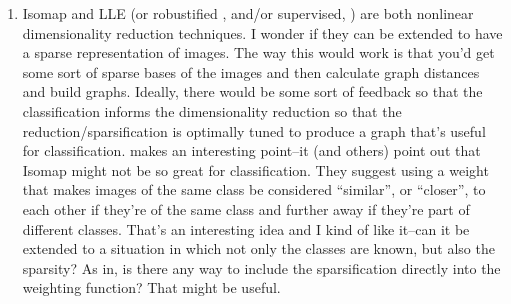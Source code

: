 \documentclass{nih}
\begin{document}
\begin{enumerate}
\item Isomap \cite{tenenbaum_global_2000} and LLE \cite{roweis_nonlinear_2000} (or robustified \cite{saxena_non-linear_2004}, and/or supervised, \cite{raducanu_supervised_2012,yang_extended_2002}) are both nonlinear dimensionality reduction techniques.  I wonder if they can be extended to have a sparse representation of images.  The way this would work is that you'd get some sort of sparse bases of the images and then calculate graph distances and build graphs.  Ideally, there would be some sort of feedback so that the classification informs the dimensionality reduction so that the reduction/sparsification is optimally tuned to produce a graph that's useful for classification.  \cite{geng_supervised_2005} makes an interesting point--it (and others) point out that Isomap might not be so great for classification.  They suggest using a weight that makes images of the same class be considered ``similar'', or ``closer'', to each other if they're of the same class and further away if they're part of different classes.  That's an interesting idea and I kind of like it--can it be extended to a situation in which not only the classes are known, but also the sparsity?  As in, is there any way to include the sparsification directly into the weighting function?  That might be useful.  


\end{enumerate}
\end{document}
